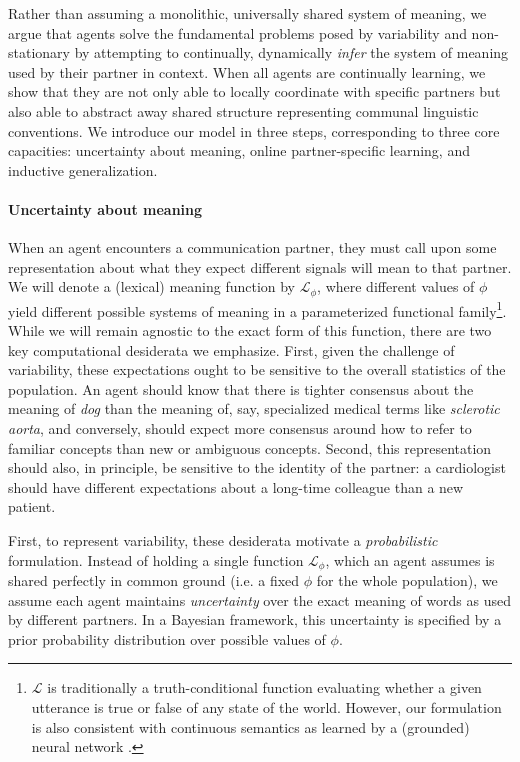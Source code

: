 Rather than assuming a monolithic, universally shared system of meaning, we argue that agents solve the fundamental problems posed by variability and non-stationary by attempting to continually, dynamically \emph{infer} the system of meaning used by their partner in context.
When all agents are continually learning, we show that they are not only able to locally coordinate with specific partners but also able to abstract away shared structure representing communal linguistic conventions.
We introduce our model in three steps, corresponding to three core capacities: uncertainty about meaning, online partner-specific learning, and inductive generalization.

\paragraph{Uncertainty about meaning} 

When an agent encounters a communication partner, they must call upon some representation about what they expect different signals will mean to that partner. 
We will denote a (lexical) meaning function by $\mathcal{L}_{\phi}$, where different values of $\phi$ yield different possible systems of meaning in a parameterized functional family\footnote{$\mathcal{L}$ is traditionally a truth-conditional function evaluating whether a given utterance is true or false of any state of the world. However, our formulation is also consistent with continuous semantics \cite{degen2020redundancy} as learned by a (grounded) neural network \cite{potts2019case}.}.
While we will remain agnostic to the exact form of this function, there are two key computational desiderata we emphasize.
First, given the challenge of variability, these expectations ought to be sensitive to the overall statistics of the population. 
An agent should know that there is tighter consensus about the meaning of \emph{dog} than the meaning of, say, specialized medical terms like \emph{sclerotic aorta}, and conversely, should expect more consensus around how to refer to familiar concepts than new or ambiguous concepts.
Second, this representation should also, in principle, be sensitive to the identity of the partner: a cardiologist should have different expectations about a long-time colleague than a new patient.

First, to represent variability, these desiderata motivate a \emph{probabilistic} formulation.
Instead of holding a single function $\mathcal{L}_{\phi}$, which an agent assumes is shared perfectly in common ground (i.e. a fixed $\phi$ for the whole population), we assume each agent maintains \emph{uncertainty} over the exact meaning of words as used by different partners.
In a Bayesian framework, this uncertainty is specified by a prior probability distribution over possible values of $\phi$.

